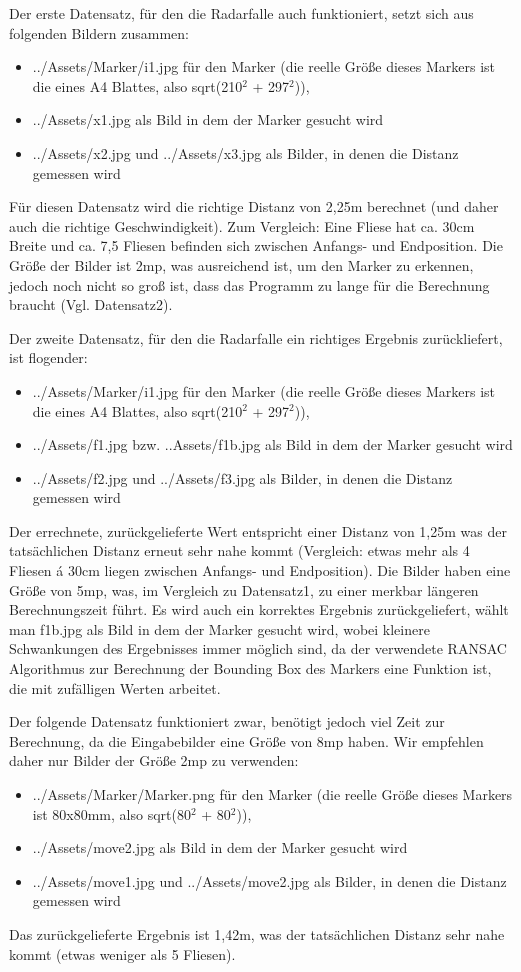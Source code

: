 \documentclass[deutsch]{scrartcl}
\begin{document}
Der erste Datensatz, für den die Radarfalle auch funktioniert, setzt sich aus folgenden Bildern zusammen: 
\begin{itemize}
	\item ../Assets/Marker/i1.jpg für den Marker (die reelle Größe dieses Markers ist die eines A4 Blattes, also sqrt(210$^2$ + 297$^2$)), 
	\item ../Assets/x1.jpg als Bild in dem der Marker gesucht wird
	\item ../Assets/x2.jpg und ../Assets/x3.jpg als Bilder, in denen die Distanz gemessen wird
\end{itemize}
Für diesen Datensatz wird die richtige Distanz von 2,25m berechnet (und daher auch die richtige Geschwindigkeit). Zum Vergleich: Eine Fliese hat ca. 30cm Breite und ca. 7,5 Fliesen befinden sich zwischen Anfangs- und Endposition. Die Größe der Bilder ist 2mp, was ausreichend ist, um den Marker zu erkennen, jedoch noch nicht so groß ist, dass das Programm zu lange für die Berechnung braucht (Vgl. Datensatz2).

Der zweite Datensatz, für den die Radarfalle ein richtiges Ergebnis zurückliefert, ist flogender:
\begin{itemize}
	\item ../Assets/Marker/i1.jpg für den Marker (die reelle Größe dieses Markers ist die eines A4 Blattes, also sqrt(210$^2$ + 297$^2$)), 
	\item ../Assets/f1.jpg bzw. ..Assets/f1b.jpg als Bild in dem der Marker gesucht wird
	\item ../Assets/f2.jpg und ../Assets/f3.jpg als Bilder, in denen die Distanz gemessen wird
\end{itemize}
Der errechnete, zurückgelieferte Wert entspricht einer Distanz von 1,25m was der tatsächlichen Distanz erneut sehr nahe kommt (Vergleich: etwas mehr als 4 Fliesen á 30cm liegen zwischen Anfangs- und Endposition). Die Bilder haben eine Größe von 5mp, was, im Vergleich zu Datensatz1, zu einer merkbar längeren Berechnungszeit führt. Es wird auch ein korrektes Ergebnis zurückgeliefert, wählt man f1b.jpg als Bild in dem der Marker gesucht wird, wobei kleinere Schwankungen des Ergebnisses immer möglich sind, da der verwendete RANSAC Algorithmus zur Berechnung der Bounding Box des Markers eine Funktion ist, die mit zufälligen Werten arbeitet.

Der folgende Datensatz funktioniert zwar, benötigt jedoch viel Zeit zur Berechnung, da die Eingabebilder eine Größe von 8mp haben. Wir empfehlen daher nur Bilder der Größe 2mp zu verwenden:
\begin{itemize}
	\item ../Assets/Marker/Marker.png für den Marker (die reelle Größe dieses Markers ist 80x80mm, also sqrt(80$^2$ + 80$^2$)), 
	\item ../Assets/move2.jpg als Bild in dem der Marker gesucht wird
	\item ../Assets/move1.jpg und ../Assets/move2.jpg als Bilder, in denen die Distanz gemessen wird
\end{itemize}
Das zurückgelieferte Ergebnis ist 1,42m, was der tatsächlichen Distanz sehr nahe kommt (etwas weniger als 5 Fliesen).
\end{document}
